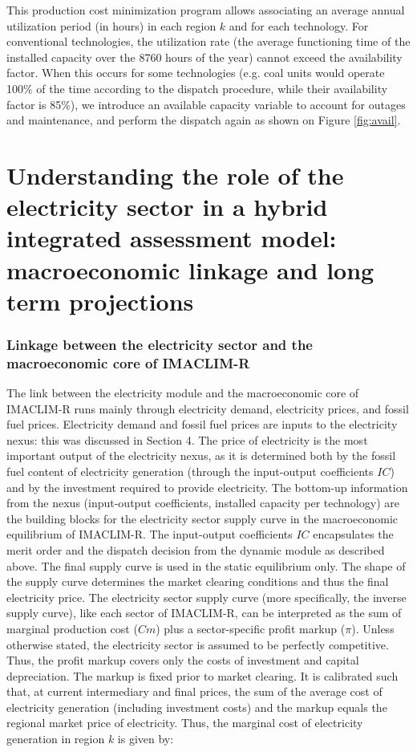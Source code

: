 This production cost minimization program allows associating an average annual utilization period (in hours) in each region $k$ and for each technology. For conventional technologies, the utilization rate (the average functioning time of the installed capacity over the 8760 hours of the year) cannot exceed the availability factor. When this occurs for some technologies (e.g. coal units would operate 100\% of the time according to the dispatch procedure, while their availability factor is 85\%), we introduce an available capacity variable to account for outages and maintenance, and perform the dispatch again as shown on Figure \ref{fig:avail}.

\part*{Understanding the role of the electricity sector in a hybrid integrated assessment model: macroeconomic linkage and long term projections}

\section{Linkage between the electricity sector and the macroeconomic core of IMACLIM-R}

The link between the electricity module and the macroeconomic core of IMACLIM-R runs mainly through electricity demand, electricity prices, and fossil fuel prices. Electricity demand and fossil fuel prices are inputs to the electricity nexus: this was discussed in Section 4. The price of electricity is the most important output of the electricity nexus, as it is determined both by the fossil fuel content of electricity generation (through the input-output coefficients $IC$) and by the investment required to provide electricity. 
The bottom-up information from the nexus (input-output coefficients, installed capacity per technology) are the building blocks for the electricity sector supply curve in the macroeconomic equilibrium of IMACLIM-R. The input-output coefficients $IC$ encapsulates the merit order and the dispatch decision from the dynamic module as described above. The final supply curve is used in the static equilibrium only.
The shape of the supply curve determines the market clearing conditions and thus the final electricity price. The electricity sector supply curve (more specifically, the inverse supply curve), like each sector of IMACLIM-R, can be interpreted as the sum of marginal production cost ($Cm$) plus a sector-specific profit markup ($\pi$). 
Unless otherwise stated, the electricity sector is assumed to be perfectly competitive. Thus, the profit markup covers only the costs of investment and capital depreciation. The markup is fixed prior to market clearing. It is calibrated such that, at current intermediary and final prices, the sum of the average cost of electricity generation (including investment costs) and the markup equals the regional market price of electricity.
Thus, the marginal cost of electricity generation in region $k$ is given by:

